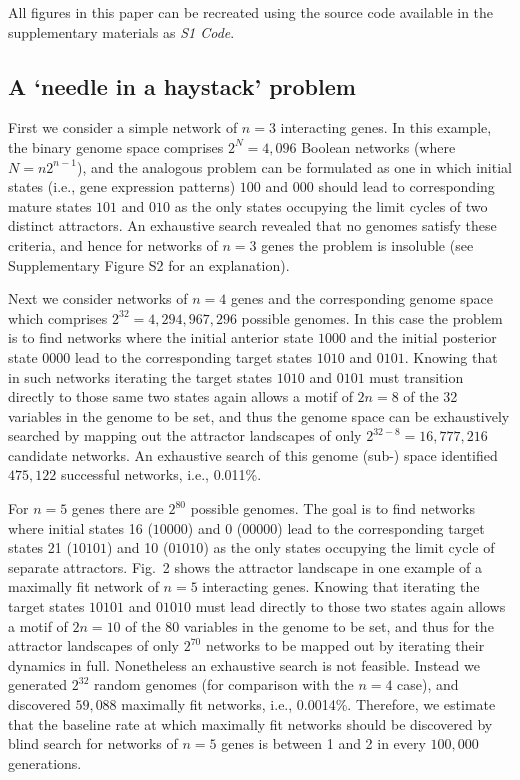 \documentclass[10pt,letterpaper]{article}
\begin{document}
All figures in this paper can be recreated using the source code available in the supplementary materials as \emph{S1 Code}.

\subsection*{A `needle in a haystack' problem}

First we consider a simple network of $n=3$ interacting genes. In this example, the binary genome space comprises $2^N=4,096$ Boolean networks (where $N=n2^{n-1}$), and the analogous problem can be formulated as one in which initial states (i.e., gene expression patterns) $100$ and $000$ should lead to corresponding mature states $101$ and $010$ as the only states occupying the limit cycles of two distinct attractors. An exhaustive search revealed that no genomes satisfy these criteria, and hence for networks of $n=3$ genes the problem is insoluble (see Supplementary Figure S2 for an explanation).

Next we consider networks of $n=4$ genes and the corresponding genome space which comprises $2^{32}=4,294,967,296$ possible genomes. In this case the problem is to find networks where the initial anterior state $1000$ and the initial posterior state $0000$ lead to the corresponding target states $1010$ and $0101$. Knowing that in such networks iterating the target states $1010$ and $0101$ must transition directly to those same two states again allows a motif of $2n=8$ of the 32 variables in the genome to be set, and thus the genome space can be exhaustively searched by mapping out the attractor landscapes of only $2^{32-8}=16,777,216$ candidate networks. An exhaustive search of this genome (sub-) space identified $475,122$ successful networks, i.e., 0.011\%.

For $n=5$ genes there are $2^{80}$ possible genomes. The goal is to find networks where initial states 16 ($10000$) and 0 ($00000$) lead to the corresponding target states 21 ($10101$) and 10 ($01010$) as the only states occupying the limit cycle of separate attractors. Fig.~2 shows the attractor landscape in one example of a maximally fit network of $n=5$ interacting genes. Knowing that iterating the target states $10101$ and $01010$ must lead directly to those two states again allows a motif of $2n=10$ of the 80 variables in the genome to be set, and thus for the attractor landscapes of only $2^{70}$ networks to be mapped out by iterating their dynamics in full. Nonetheless an exhaustive search is not feasible. Instead we generated $2^{32}$ random genomes (for comparison with the $n=4$ case), and discovered $59,088$ maximally fit networks, i.e., 0.0014\%. Therefore, we estimate that the baseline rate at which maximally fit networks should be discovered by blind search for networks of $n=5$ genes is between 1 and 2 in every $100,000$ generations.
\end{document}
